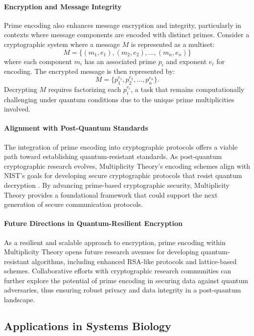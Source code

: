 \documentclass{article}
\begin{document}
\paragraph{Encryption and Message Integrity}

Prime encoding also enhances message encryption and integrity, particularly in contexts where message components are encoded with distinct primes. Consider a cryptographic system where a message \( M \) is represented as a multiset:
\[
M = \{(m_1, e_1), (m_2, e_2), \ldots, (m_n, e_n)\}
\]
where each component \( m_i \) has an associated prime \( p_i \) and exponent \( e_i \) for encoding. The encrypted message is then represented by:
\[
M = \{p_1^{e_1}, p_2^{e_2}, \ldots, p_n^{e_n}\}.
\]
Decrypting \( M \) requires factorizing each \( p_i^{e_i} \), a task that remains computationally challenging under quantum conditions due to the unique prime multiplicities involved.

\paragraph{Alignment with Post-Quantum Standards}

The integration of prime encoding into cryptographic protocols offers a viable path toward establishing quantum-resistant standards. As post-quantum cryptographic research evolves, Multiplicity Theory’s encoding schemes align with NIST’s goals for developing secure cryptographic protocols that resist quantum decryption \cite{nist2016}. By advancing prime-based cryptographic security, Multiplicity Theory provides a foundational framework that could support the next generation of secure communication protocols.

\paragraph{Future Directions in Quantum-Resilient Encryption}

As a resilient and scalable approach to encryption, prime encoding within Multiplicity Theory opens future research avenues for developing quantum-resistant algorithms, including enhanced RSA-like protocols and lattice-based schemes. Collaborative efforts with cryptographic research communities can further explore the potential of prime encoding in securing data against quantum adversaries, thus ensuring robust privacy and data integrity in a post-quantum landscape.

\subsection{Applications in Systems Biology}
\end{document}
